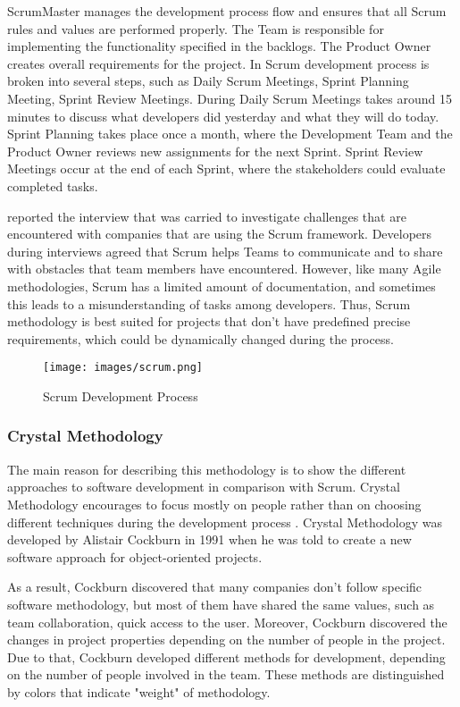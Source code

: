 \documentclass[a4paper]{article}
\begin{document}
    ScrumMaster manages the development process flow and ensures that all Scrum rules and values are performed properly. The Team is responsible for implementing the functionality specified in the backlogs. The Product Owner creates overall requirements for the project. In Scrum development process is broken into several steps, such as Daily Scrum Meetings, Sprint Planning Meeting, Sprint Review Meetings. During Daily Scrum Meetings takes around 15 minutes to discuss what developers did yesterday and what they will do today. Sprint Planning takes place once a month, where the Development Team and the Product Owner reviews new assignments for the next Sprint. Sprint Review Meetings occur at the end of each Sprint, where the stakeholders could evaluate completed tasks. 
    
    \cite{cho2008issues} reported the interview that was carried to investigate challenges that are encountered with companies that are using the Scrum framework. Developers during interviews agreed that Scrum helps Teams to communicate and to share with obstacles that team members have encountered. However, like many Agile methodologies, Scrum has a limited amount of documentation, and sometimes this leads to a misunderstanding of tasks among developers. Thus, Scrum methodology is best suited for projects that don't have predefined precise requirements, which could be dynamically changed during the process.
  
    
    
    \begin{figure}[H]
    \centering
     \texttt{[image: images/scrum.png]}
     \label{scrumDevelopmentProcess}
     \caption{Scrum Development Process}
    \end{figure}
    
    \subsubsection{Crystal Methodology}
    The main reason for describing this methodology is to show the different approaches to software development in comparison with Scrum. Crystal Methodology encourages to focus mostly on people rather than on choosing different techniques during the development process \cite{kumar2012impact}. Crystal Methodology was developed by Alistair Cockburn in 1991 when he was told to create a new software approach for object-oriented projects. 
    
    As a result, Cockburn discovered that many companies don't follow specific software methodology, but most of them have shared the same values, such as team collaboration, quick access to the user. Moreover, Cockburn discovered the changes in project properties depending on the number of people in the project. Due to that, Cockburn developed different methods for development, depending on the number of people involved in the team. These methods are distinguished by colors that indicate "weight" of methodology.
\end{document}
